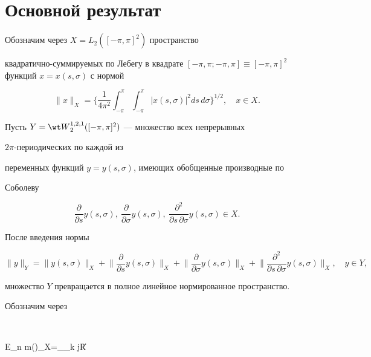 \section{Основной результат} 


 


Обозначим через $X=L_2([-\pi,\pi]^2)$ пространство 


квадратично-суммируемых по Лебегу в квадрате $[-\pi,\pi;-\pi,\pi]\equiv 


[-\pi,\pi]^2$ функций $x=x(s,\sigma)$ с нормой 


$$ 


\|x\|_X=\bigg\{\frac{1}{4\pi^2}\int^\pi_{-\pi} 


\int^\pi_{-\pi}|x(s,\sigma)|^2ds\,d\sigma\bigg\}^{1/2},\quad 


x\in X. 


$$ 


Пусть $Y=\wt W{}^{1,2,1}_2([-\pi,\pi]^2)$ --- множество всех непрерывных 


$2\pi$-периодических по каждой из 


переменных функций $y=y(s,\sigma)$, имеющих обобщенные производные по 


Соболеву 


$$ 


\frac{\partial}{\partial s}y(s,\sigma),\ 


\frac{\partial}{\partial\sigma}y(s,\sigma),\ 


\frac{\partial^2}{\partial s\,\partial\sigma}y(s,\sigma)\in X. 


$$ 


После введения нормы 


$$ 


\|y\|_Y=\|y(s,\sigma)\|_X+\bigg\|\frac{\partial}{\partial s} 


y(s,\sigma)\bigg\|_X+\bigg\|\frac{\partial}{\partial\sigma} 


y(s,\sigma)\bigg\|_X+\bigg\| 


\frac{\partial^2}{\partial s\,\partial\sigma}y(s,\sigma)\bigg\|_X, 


\quad y\in Y, 


$$ 


множество $Y$ превращается в полное линейное нормированное пространство. 


Обозначим через 


$$ 


E_{n m}(\varphi)_X=\inf_{\alpha_{k j}\in\Bbb R}\bigg\| 


